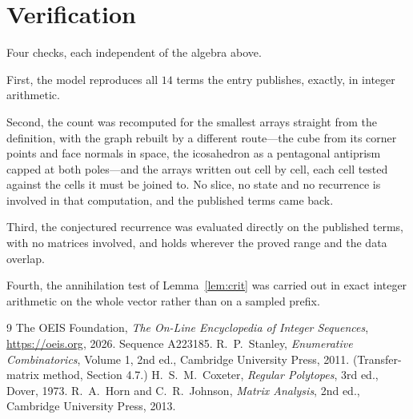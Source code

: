 \documentclass[11pt,a4paper]{article}
\theoremstyle{plain}
\theoremstyle{definition}
\begin{document}
\section{Verification}

Four checks, each independent of the algebra above.

First, the model reproduces all $14$ terms the entry publishes, exactly, in integer
arithmetic.

Second, the count was recomputed for the smallest arrays straight from the definition, with the
graph rebuilt by a different route---the cube from its corner points and face normals in space,
the icosahedron as a pentagonal antiprism capped at both poles---and the arrays written out cell
by cell, each cell tested against the cells it must be joined to. No slice, no state and no
recurrence is involved in that computation, and the published terms came back.

Third, the conjectured recurrence was evaluated directly on the published terms, with no
matrices involved, and holds wherever the proved range and the data overlap.

Fourth, the annihilation test of Lemma~\ref{lem:crit} was carried out in exact integer
arithmetic on the whole vector rather than on a sampled prefix.

\begin{thebibliography}{9}
 The OEIS Foundation, \emph{The On-Line Encyclopedia of Integer
Sequences}, \url{https://oeis.org}, 2026. Sequence A223185.
 R.~P.~Stanley, \emph{Enumerative Combinatorics}, Volume 1, 2nd ed.,
Cambridge University Press, 2011. (Transfer-matrix method, Section 4.7.)
 H.~S.~M.~Coxeter, \emph{Regular Polytopes}, 3rd ed., Dover, 1973.
 R.~A.~Horn and C.~R.~Johnson, \emph{Matrix Analysis}, 2nd ed., Cambridge
University Press, 2013.
\end{thebibliography}
\end{document}
